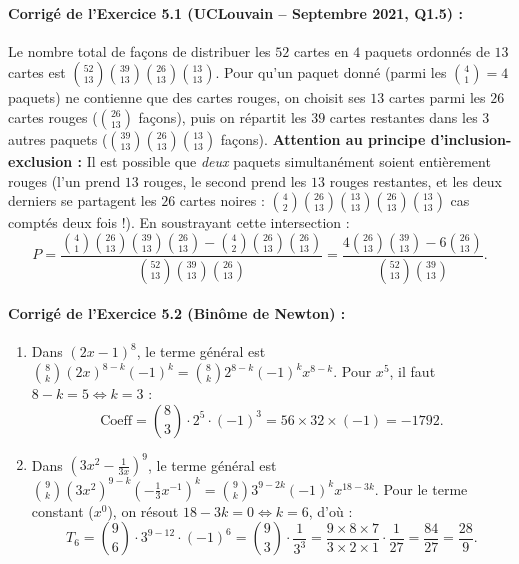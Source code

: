 \paragraph{Corrigé de l'Exercice 5.1 (UCLouvain -- Septembre 2021, Q1.5) :}
Le nombre total de façons de distribuer les $52$ cartes en $4$ paquets ordonnés de $13$ cartes est $\binom{52}{13}\binom{39}{13}\binom{26}{13}\binom{13}{13}$.
Pour qu'un paquet donné (parmi les $\binom{4}{1} = 4$ paquets) ne contienne que des cartes rouges, on choisit ses $13$ cartes parmi les $26$ cartes rouges ($\binom{26}{13}$ façons), puis on répartit les $39$ cartes restantes dans les $3$ autres paquets ($\binom{39}{13}\binom{26}{13}\binom{13}{13}$ façons).
\textbf{Attention au principe d'inclusion-exclusion :} Il est possible que \emph{deux} paquets simultanément soient entièrement rouges (l'un prend $13$ rouges, le second prend les $13$ rouges restantes, et les deux derniers se partagent les $26$ cartes noires : $\binom{4}{2}\binom{26}{13}\binom{13}{13}\binom{26}{13}\binom{13}{13}$ cas comptés deux fois !). En soustrayant cette intersection :
\[
    \boxed{P = \frac{\binom{4}{1}\binom{26}{13}\binom{39}{13}\binom{26}{13} - \binom{4}{2}\binom{26}{13}\binom{26}{13}}{\binom{52}{13}\binom{39}{13}\binom{26}{13}} = \frac{4\binom{26}{13}\binom{39}{13} - 6\binom{26}{13}}{\binom{52}{13}\binom{39}{13}}}.
\]

\paragraph{Corrigé de l'Exercice 5.2 (Binôme de Newton) :}
\begin{enumerate}[label=(\alph*)]
    \item Dans $(2x - 1)^8$, le terme général est $\binom{8}{k}(2x)^{8-k}(-1)^k = \binom{8}{k}2^{8-k}(-1)^k x^{8-k}$. Pour $x^5$, il faut $8 - k = 5 \iff k = 3$ :
    \[
        \text{Coeff} = \binom{8}{3}\cdot 2^5 \cdot (-1)^3 = 56 \times 32 \times (-1) = \boxed{-1792}.
    \]
    \item Dans $\left(3x^2 - \frac{1}{3x}\right)^9$, le terme général est $\binom{9}{k}(3x^2)^{9-k}\left(-\frac{1}{3}x^{-1}\right)^k = \binom{9}{k}3^{9-2k}(-1)^k x^{18-3k}$.
    Pour le terme constant ($x^0$), on résout $18 - 3k = 0 \iff k = 6$, d'où :
    \[
        T_6 = \binom{9}{6}\cdot 3^{9-12}\cdot (-1)^6 = \binom{9}{3}\cdot \frac{1}{3^3} = \frac{9 \times 8 \times 7}{3 \times 2 \times 1} \cdot \frac{1}{27} = \frac{84}{27} = \boxed{\frac{28}{9}}.
    \]
\end{enumerate}

